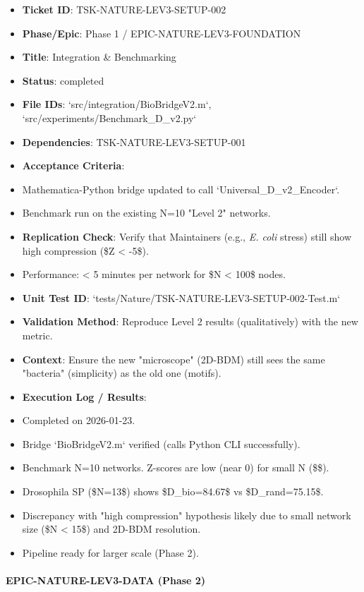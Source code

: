 \documentclass{article}
\begin{document}
\begin{itemize}
\item   \textbf{Ticket ID}: TSK-NATURE-LEV3-SETUP-002
\item   \textbf{Phase/Epic}: Phase 1 / EPIC-NATURE-LEV3-FOUNDATION
\item   \textbf{Title}: Integration \& Benchmarking
\item   \textbf{Status}: completed
\item   \textbf{File IDs}: `src/integration/BioBridgeV2.m`, `src/experiments/Benchmark\_D\_v2.py`
\item   \textbf{Dependencies}: TSK-NATURE-LEV3-SETUP-001
\item   \textbf{Acceptance Criteria}:
\item   Mathematica-Python bridge updated to call `Universal\_D\_v2\_Encoder`.
\item   Benchmark run on the existing N=10 "Level 2" networks.
\item   \textbf{Replication Check}: Verify that Maintainers (e.g., \textit{E. coli} stress) still show high compression (\$Z < -5\$).
\item   Performance: < 5 minutes per network for \$N < 100\$ nodes.
\item   \textbf{Unit Test ID}: `tests/Nature/TSK-NATURE-LEV3-SETUP-002-Test.m`
\item   \textbf{Validation Method}: Reproduce Level 2 results (qualitatively) with the new metric.
\item   \textbf{Context}: Ensure the new "microscope" (2D-BDM) still sees the same "bacteria" (simplicity) as the old one (motifs).
\item   \textbf{Execution Log / Results}:
\item   Completed on 2026-01-23.
\item   Bridge `BioBridgeV2.m` verified (calls Python CLI successfully).
\item   Benchmark N=10 networks. Z-scores are low (near 0) for small N (\$\$).
\item   Drosophila SP (\$N=13\$) shows \$D\_{bio}=84.67\$ vs \$D\_{rand}=75.15\$.
\item   Discrepancy with "high compression" hypothesis likely due to small network size (\$N < 15\$) and 2D-BDM resolution.
\item   Pipeline ready for larger scale (Phase 2).
\end{itemize}


\paragraph{EPIC-NATURE-LEV3-DATA (Phase 2)}
\end{document}
